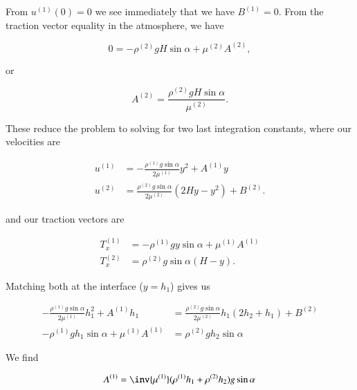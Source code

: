 From $u^{(1)}(0) = 0$ we see immediately that we have $B^{(1)} = 0$.  From the traction vector equality in the atmosphere, we have 

\begin{equation}\label{eqn:twoLayerInclinedFlowDifferentDensities:455}
0 = - \rho^{(2)} g H \sin\alpha + \mu^{(2)} A^{(2)},
\end{equation}

or

\begin{equation}\label{eqn:twoLayerInclinedFlowDifferentDensities:475}
A^{(2)} = \frac{\rho^{(2)} g H \sin\alpha }{ \mu^{(2)} }.
\end{equation}

These reduce the problem to solving for two last integration constants, where our velocities are

\begin{align}\label{eqn:twoLayerInclinedFlowDifferentDensities:495}
u^{(1)} &= -\frac{\rho^{(1)} g \sin\alpha }{2 \mu^{(1)}} y^2 + A^{(1)} y \\
u^{(2)} &= \frac{\rho^{(2)} g \sin\alpha }{2 \mu^{(2)}} \left( 2 H y -y^2 \right) + B^{(2)}.
\end{align}

and our traction vectors are

\begin{align}\label{eqn:twoLayerInclinedFlowDifferentDensities:515}
T_x^{(1)} &= - \rho^{(1)} g y \sin\alpha + \mu^{(1)} A^{(1)} \\
T_x^{(2)} &= \rho^{(2)} g \sin\alpha \left( H - y \right).
\end{align}

Matching both at the interface ($y = h_1$) gives us

\begin{align}\label{eqn:twoLayerInclinedFlowDifferentDensities:535}
-\frac{\rho^{(1)} g \sin\alpha }{2 \mu^{(1)}} h_1^2 + A^{(1)} h_1 &= \frac{\rho^{(2)} g \sin\alpha }{2 \mu^{(2)}} h_1 \left( 2 h_2 + h_1 \right) + B^{(2)} \\
- \rho^{(1)} g h_1 \sin\alpha + \mu^{(1)} A^{(1)} &= \rho^{(2)} g h_2 \sin\alpha 
\end{align}

We find

\begin{equation}\label{eqn:twoLayerInclinedFlowDifferentDensities:555}
A^{(1)} = 
\inv{ \mu^{(1)} }
(\rho^{(1)} h_1 + \rho^{(2)} h_2 )
g \sin\alpha 
\end{equation}

